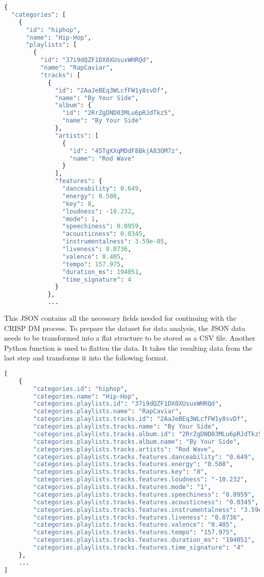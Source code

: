 \begin{lstlisting}[language=Python]
{
  "categories": [
    {
      "id": "hiphop",
      "name": "Hip-Hop",
      "playlists": [
        {
          "id": "37i9dQZF1DX0XUsuxWHRQd",
          "name": "RapCaviar",
          "tracks": [
            {
              "id": "2AaJeBEq3WLcfFW1y8svDf",
              "name": "By Your Side",
              "album": {
                "id": "2RrZgDND03MLu6pRJdTkz5",
                "name": "By Your Side"
              },
              "artists": [
                {
                  "id": "45TgXXqMDdF8BkjA83OM7z",
                  "name": "Rod Wave"
                }
              ],
              "features": {
                "danceability": 0.649,
                "energy": 0.508,
                "key": 8,
                "loudness": -10.232,
                "mode": 1,
                "speechiness": 0.0959,
                "acousticness": 0.0345,
                "instrumentalness": 3.59e-05,
                "liveness": 0.0736,
                "valence": 0.405,
                "tempo": 157.975,
                "duration_ms": 194051,
                "time_signature": 4
              }
            },
            ...
\end{lstlisting}

This JSON contains all the necessary fields needed for continuing with the CRISP DM process.
To prepare the dataset for data analysis, the JSON data needs to be transformed into a flat structure to
be stored as a CSV file.
Another Python function is used to flatten the data. It takes the resulting data from the last step and
transforms it into the following format.

\begin{lstlisting}[language=Python]
[
    {
        "categories.id": "hiphop",
        "categories.name": "Hip-Hop",
        "categories.playlists.id": "37i9dQZF1DX0XUsuxWHRQd",
        "categories.playlists.name": "RapCaviar",
        "categories.playlists.tracks.id": "2AaJeBEq3WLcfFW1y8svDf",
        "categories.playlists.tracks.name": "By Your Side",
        "categories.playlists.tracks.album.id": "2RrZgDND03MLu6pRJdTkz5",
        "categories.playlists.tracks.album.name": "By Your Side",
        "categories.playlists.tracks.artists": "Rod Wave",
        "categories.playlists.tracks.features.danceability": "0.649",
        "categories.playlists.tracks.features.energy": "0.508",
        "categories.playlists.tracks.features.key": "8",
        "categories.playlists.tracks.features.loudness": "-10.232",
        "categories.playlists.tracks.features.mode": "1",
        "categories.playlists.tracks.features.speechiness": "0.0959",
        "categories.playlists.tracks.features.acousticness": "0.0345",
        "categories.playlists.tracks.features.instrumentalness": "3.59e-05",
        "categories.playlists.tracks.features.liveness": "0.0736",
        "categories.playlists.tracks.features.valence": "0.405",
        "categories.playlists.tracks.features.tempo": "157.975",
        "categories.playlists.tracks.features.duration_ms": "194051",
        "categories.playlists.tracks.features.time_signature": "4"
    }, 
    ...
]
\end{lstlisting}

